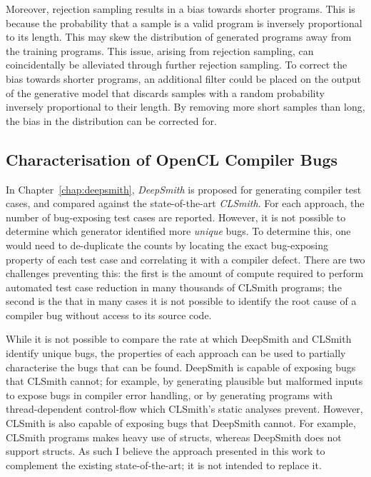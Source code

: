 Moreover, rejection sampling results in a bias towards shorter programs. This is because the probability that a sample is a valid program is inversely proportional to its length. This may skew the distribution of generated programs away from the training programs. This issue, arising from rejection sampling, can coincidentally be alleviated through further rejection sampling. To correct the bias towards shorter programs, an additional filter could be placed on the output of the generative model that discards samples with a random probability inversely proportional to their length. By removing more short samples than long, the bias in the distribution can be corrected for.


\subsection{Characterisation of OpenCL Compiler Bugs}

In Chapter~\ref{chap:deepsmith}, \emph{DeepSmith} is proposed for generating compiler test cases, and compared against the state-of-the-art \emph{CLSmith}. For each approach, the number of bug-exposing test cases are reported. However, it is not possible to determine which generator identified more \emph{unique} bugs. To determine this, one would need to de-duplicate the counts by locating the exact bug-exposing property of each test case and correlating it with a compiler defect. There are two challenges preventing this: the first is the amount of compute required to perform automated test case reduction in many thousands of CLSmith programs; the second is the that in many cases it is not possible to identify the root cause of a compiler bug without access to its source code.

While it is not possible to compare the rate at which DeepSmith and CLSmith identify unique bugs, the properties of each approach can be used to partially characterise the bugs that can be found. DeepSmith is capable of exposing bugs that CLSmith cannot; for example, by generating plausible but malformed inputs to expose bugs in compiler error handling, or by generating programs with thread-dependent control-flow which CLSmith's static analyses prevent. However, CLSmith is also capable of exposing bugs that DeepSmith cannot. For example, CLSmith programs makes heavy use of structs, whereas DeepSmith does not support structs. As such I believe the approach presented in this work to complement the existing state-of-the-art; it is not intended to replace it.


